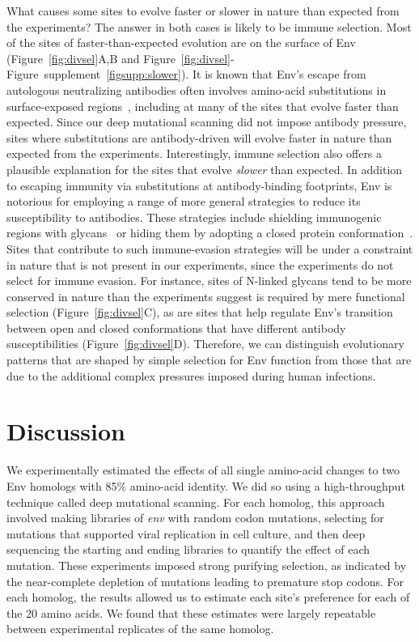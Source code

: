 \documentclass[9pt]{elife}
\begin{document}
What causes some sites to evolve faster or slower in nature than expected from the experiments?
The answer in both cases is likely to be immune selection.
Most of the sites of faster-than-expected evolution are on the surface of Env (Figure~\ref{fig:divsel}A,B and Figure~\ref{fig:divsel}-Figure~supplement~\ref{figsupp:slower}).
It is known that Env's escape from autologous neutralizing antibodies often involves amino-acid substitutions in surface-exposed regions~\citep{moore2009specificity}, including at many of the sites that evolve faster than expected.
Since our deep mutational scanning did not impose antibody pressure, sites where substitutions are antibody-driven will evolve faster in nature than expected from the experiments.
Interestingly, immune selection also offers a plausible explanation for the sites that evolve \emph{slower} than expected.
In addition to escaping immunity via substitutions at antibody-binding footprints, Env is notorious for employing a range of more general strategies to reduce its susceptibility to antibodies.
These strategies include shielding immunogenic regions with glycans~\citep{wei2003antibody,stewart2016trimeric} or hiding them by adopting a closed protein conformation~\citep{kwong2002hiv,guttman2015antibody,ozorowski2017open}.
Sites that contribute to such immune-evasion strategies will be under a constraint in nature that is not present in our experiments, since the experiments do not select for immune evasion.
For instance, sites of N-linked glycans tend to be more conserved in nature than the experiments suggest is required by mere functional selection (Figure~\ref{fig:divsel}C), as are sites that help regulate Env's transition between open and closed conformations that have different antibody susceptibilities (Figure~\ref{fig:divsel}D).
Therefore, we can distinguish evolutionary patterns that are shaped by simple selection for Env function from those that are due to the additional complex pressures imposed during human infections. 

\section{Discussion}
We experimentally estimated the effects of all single amino-acid changes to two Env homologs with 85\% amino-acid identity.
We did so using a high-throughput technique called deep mutational scanning.
For each homolog, this approach involved making libraries of \textit{env} with random codon mutations, selecting for mutations that supported viral replication in cell culture, and then deep sequencing the starting and ending libraries to quantify the effect of each mutation.
These experiments imposed strong purifying selection, as indicated by the near-complete depletion of mutations leading to premature stop codons.
For each homolog, the results allowed us to estimate each site's preference for each of the 20 amino acids.
We found that these estimates were largely repeatable between experimental replicates of the same homolog.
\end{document}
